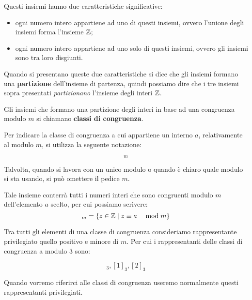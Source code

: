 Questi insiemi hanno due caratteristiche significative:
\begin{itemize}
    \item ogni numero intero appartiene ad uno di questi insiemi, ovvero l'unione degli insiemi forma l'insieme $ \mathbb{Z} $;
    \item ogni numero intero appartiene ad uno solo di questi insiemi, ovvero gli insiemi sono tra loro disgiunti.
\end{itemize}

Quando si presentano queste due caratteristiche si dice che gli insiemi formano una \textbf{partizione} dell'insieme di partenza, quindi possiamo dire che i tre insiemi sopra presentati \emph{partizionano} l'insieme degli interi $ \mathbb{Z} $.

\begin{mdframed}
    \begin{definizione}
        Gli insiemi che formano una partizione degli interi in base ad una congruenza modulo $m$ si chiamano \textbf{classi di congruenza}.
    \end{definizione}
\end{mdframed}

Per indicare la classe di congruenza a cui appartiene un interno $a$, relativamente al modulo $m$, si utilizza la seguente notazione:

\begin{equation*}
    [a]_m
\end{equation*}

Talvolta, quando si lavora con un unico modulo o quando è chiaro quale modulo si sta usando, si può omettere il pedice $m$.

Tale insieme conterrà tutti i numeri interi che sono congruenti modulo $m$ dell'elemento $a$ scelto, per cui possiamo scrivere:
\begin{equation*}
    [a]_m = \{z \in \Z \mid \congruenti{z}{a}{m}\}
\end{equation*}

Tra tutti gli elementi di una classe di congruenza consideriamo rappresentante privilegiato quello positivo e minore di $m$. Per cui i rappresentanti delle classi di congruenza a modulo 3 sono:

\begin{equation*}
    [0]_3, [1]_3, [2]_3
\end{equation*}

Quando vorremo riferirci alle classi di congruenza useremo normalmente questi rappresentanti privilegiati.


